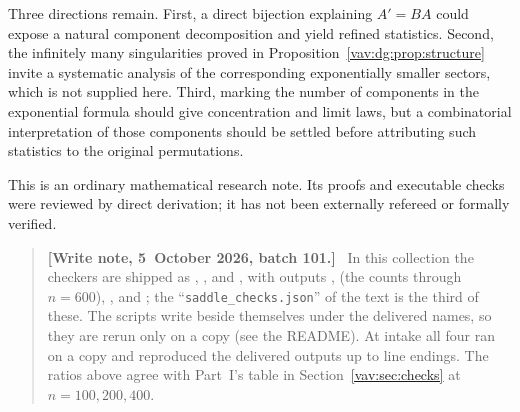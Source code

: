 \documentclass[11pt]{article}
\theoremstyle{remark}\newtheorem{remark}[theorem]{Remark}
\newenvironment{writenoteb}{\begin{quote}\small\raggedright\textbf{[Write note, 5~October 2026, batch 101.]}\ }{\end{quote}}
\begin{document}
Three directions remain. First, a direct bijection explaining
$A'=B A$ could expose a natural component decomposition and yield refined
statistics. Second, the infinitely many singularities proved in
Proposition~\ref{vav:dg:prop:structure} invite a systematic analysis of the
corresponding exponentially smaller sectors, which is not supplied here.
Third, marking the number of
components in the exponential formula should give concentration and limit
laws, but a combinatorial interpretation of those components should be
settled before attributing such statistics to the original permutations.

This is an ordinary mathematical research note. Its proofs and executable
checks were reviewed by direct derivation; it has not been externally
refereed or formally verified.
\begin{writenoteb}
In this collection the checkers are shipped as
, ,
 and
, with outputs
, 
(the counts through $n=600$), ,
 and
; the
``\texttt{saddle\_checks.json}'' of the text is the third of these. The
scripts write beside themselves under the delivered names, so they are
rerun only on a copy (see the README). At intake all four ran on a copy and
reproduced the delivered outputs up to line endings. The ratios above agree
with Part~I's table in Section~\ref{vav:sec:checks} at $n=100,200,400$.
\end{writenoteb}
\end{document}
